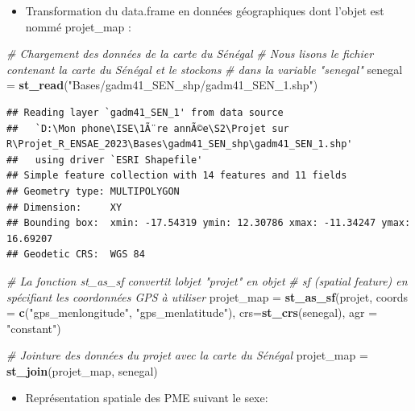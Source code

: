 \documentclass[
]{article}
\newenvironment{Shaded}{\begin{snugshade}}{\end{snugshade}}
\newcommand{\AttributeTok}[1]{\textcolor[rgb]{0.13,0.29,0.53}{#1}}
\newcommand{\CommentTok}[1]{\textcolor[rgb]{0.56,0.35,0.01}{\textit{#1}}}
\newcommand{\FunctionTok}[1]{\textcolor[rgb]{0.13,0.29,0.53}{\textbf{#1}}}
\newcommand{\NormalTok}[1]{#1}
\newcommand{\OtherTok}[1]{\textcolor[rgb]{0.56,0.35,0.01}{#1}}
\newcommand{\StringTok}[1]{\textcolor[rgb]{0.31,0.60,0.02}{#1}}
\providecommand{\tightlist}{%
  \setlength{\itemsep}{0pt}\setlength{\parskip}{0pt}}
\begin{document}
\begin{itemize}
\tightlist
\item
  Transformation du data.frame en données géographiques dont l'objet est
  nommé projet\_map :
\end{itemize}

\begin{Shaded}
\begin{Highlighting}[]
\CommentTok{\# Chargement des données de la carte du Sénégal}
\CommentTok{\# Nous lisons le fichier contenant la carte du Sénégal et le stockons }
\CommentTok{\# dans la variable "senegal"}
\NormalTok{senegal }\OtherTok{=} \FunctionTok{st\_read}\NormalTok{(}\StringTok{"Bases/gadm41\_SEN\_shp/gadm41\_SEN\_1.shp"}\NormalTok{)}
\end{Highlighting}
\end{Shaded}

\begin{verbatim}
## Reading layer `gadm41_SEN_1' from data source 
##   `D:\Mon phone\ISE\1Ã¨re annÃ©e\S2\Projet sur R\Projet_R_ENSAE_2023\Bases\gadm41_SEN_shp\gadm41_SEN_1.shp' 
##   using driver `ESRI Shapefile'
## Simple feature collection with 14 features and 11 fields
## Geometry type: MULTIPOLYGON
## Dimension:     XY
## Bounding box:  xmin: -17.54319 ymin: 12.30786 xmax: -11.34247 ymax: 16.69207
## Geodetic CRS:  WGS 84
\end{verbatim}

\begin{Shaded}
\begin{Highlighting}[]
\CommentTok{\# La fonction st\_as\_sf convertit l\textquotesingle{}objet "projet" en objet }
\CommentTok{\# sf (spatial feature) en spécifiant les coordonnées GPS à utiliser}
\NormalTok{projet\_map }\OtherTok{=} \FunctionTok{st\_as\_sf}\NormalTok{(projet, }\AttributeTok{coords =} \FunctionTok{c}\NormalTok{(}\StringTok{"gps\_menlongitude"}\NormalTok{, }\StringTok{"gps\_menlatitude"}\NormalTok{), }\AttributeTok{crs=}\FunctionTok{st\_crs}\NormalTok{(senegal), }\AttributeTok{agr =} \StringTok{"constant"}\NormalTok{)}

\CommentTok{\# Jointure des données du projet avec la carte du Sénégal}
\NormalTok{projet\_map }\OtherTok{=} \FunctionTok{st\_join}\NormalTok{(projet\_map, senegal)}
\end{Highlighting}
\end{Shaded}

\begin{itemize}
\tightlist
\item
  Représentation spatiale des PME suivant le sexe:
\end{itemize}
\end{document}

